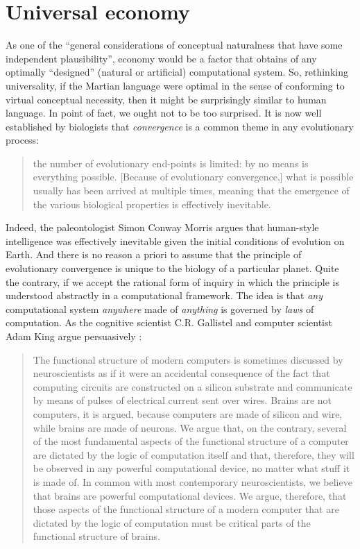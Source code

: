 \documentclass[output=paper]{langsci/langscibook}
\begin{document}
\section{Universal economy}

\largerpage
As one of the “general considerations of conceptual naturalness that have some
independent plausibility”, economy would be a factor that obtains of any
optimally “designed” (natural or artificial) computational system. So,
rethinking universality, if the Martian language were optimal in the sense of
conforming to virtual conceptual necessity, then it might be surprisingly
similar to human language. In point of fact, we ought not to be too surprised.
It is now well established by biologists that \emph{convergence} is a common
theme in any evolutionary process: \blockquote{the number of evolutionary
    end-points is limited: by no means is everything possible. [Because of
    evolutionary convergence,] what is possible usually has been arrived at
    multiple times, meaning that the emergence of the various biological
properties is effectively inevitable.\\\hspace*{\fill}\parencite[xii--xiii]{ConwayMorris2013}}
Indeed, the paleontologist Simon Conway Morris argues that human-style
intelligence was effectively inevitable given the initial conditions of
evolution on Earth. And there is no reason a priori to assume that the
principle of evolutionary convergence is unique to the biology of a particular
planet. Quite the contrary, if we accept the rational form of inquiry in which
the principle is understood abstractly in a computational framework. The idea
is that \emph{any} computational system \emph{anywhere} made of \emph{anything}
is governed by \emph{laws} of computation. As the cognitive scientist C.R.
Gallistel and computer scientist Adam King argue persuasively
\parencite[167]{GallistelKing2010}:

\begin{quote}The functional structure of modern computers is sometimes discussed by
neuroscientists as if it were an accidental consequence of the fact that
computing circuits are constructed on a silicon substrate and communicate by
means of pulses of electrical current sent over wires. Brains are not
computers, it is argued, because computers are made of silicon and wire, while
brains are made of neurons. We argue that, on the contrary, several of the most
fundamental aspects of the functional structure of a computer are dictated by
the logic of computation itself and that, therefore, they will be observed in
any powerful computational device, no matter what stuff it is made of. In
common with most contemporary neuroscientists, we believe that brains are
powerful computational devices. We argue, therefore, that those aspects of the
functional structure of a modern computer that are dictated by the logic of
computation must be critical parts of the functional structure of brains.\hfill%
\hbox{\parencite[167]{GallistelKing2010}}
\end{quote}
\end{document}
